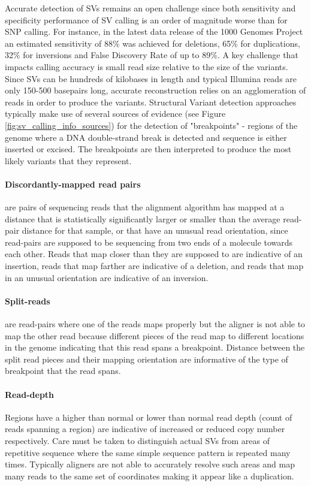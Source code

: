 Accurate detection of SVs remains an open challenge since both sensitivity and specificity performance of SV calling is an order of magnitude worse than for SNP calling. For instance, in the latest data release of the 1000 Genomes Project an estimated sensitivity of 88\% was achieved for deletions, 65\% for duplications, 32\% for inversions\autocite{sudmant2015integrated} and False Discovery Rate of up to 89\%\autocite{mills2011mapping}. A key challenge that impacts calling accuracy is small read size relative to the size of the variants. Since SVs can be hundreds of kilobases in length and typical Illumina reads are only 150-500 basepairs long, accurate reconstruction relies on an agglomeration of reads in order to produce the variants. Structural Variant detection approaches typically make use of several sources of evidence (see Figure \ref{fig:sv_calling_info_sources}) for the detection of "breakpoints" - regions of the genome where a DNA double-strand break is detected and sequence is either inserted or excised. The breakpoints are then interpreted to produce the most likely variants that they represent. 

\paragraph{Discordantly-mapped read pairs} are pairs of sequencing reads that the alignment algorithm has mapped at a distance that is statistically significantly larger or smaller than the average read-pair distance for that sample, or that have an unusual read orientation, since read-pairs are supposed to be sequencing from two ends of a molecule towards each other. Reads that map closer than they are supposed to are indicative of an insertion, reads that map farther are indicative of a deletion, and reads that map in an unusual orientation are indicative of an inversion. 

\paragraph{Split-reads} are read-pairs where one of the reads maps properly but the aligner is not able to map the other read because different pieces of the read map to different locations in the genome indicating that this read spans a breakpoint. Distance between the split read pieces and their mapping orientation are informative of the type of breakpoint that the read spans.

\paragraph{Read-depth} Regions have a higher than normal or lower than normal read depth (count of reads spanning a region) are indicative of increased or reduced copy number respectively. Care must be taken to distinguish actual SVs from areas of repetitive sequence where the same simple sequence pattern is repeated many times. Typically aligners are not able to accurately resolve such areas and map many reads to the same set of coordinates making it appear like a duplication.

